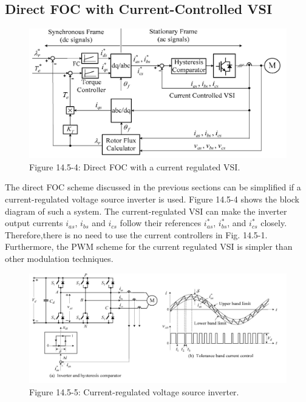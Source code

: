 \documentclass[letterpaper,12pt]{article}
\begin{document}
\subsection{Direct FOC with Current-Controlled VSI}

\begin{figure}[h]
\centering
\includegraphics[scale=0.9]{graficos/img16.jpg}
\caption{Figure 14.5-4: Direct FOC with a current regulated VSI.}
\end{figure}
\FloatBarrier

The direct FOC scheme discussed in the previous sections can be simplified if a current-regulated voltage source inverter is used. Figure 14.5-4 shows the block diagram of such a system. The current-regulated VSI can make the inverter output currents $i_{as}$, $i_{bs}$ and $i_{cs}$ follow their references $i_{as}^*$, $i_{bs}^*$, and $i_{cs}^*$ closely. Therefore,there is no need to use the current controllers in Fig. 14.5-1. Furthermore, the PWM scheme for the current regulated VSI is simpler than other modulation techniques.

\begin{figure}[h]
\centering
\includegraphics[scale=0.8]{graficos/img17.jpg}
\caption{Figure 14.5-5: Current-regulated voltage source inverter.}
\end{figure}
\FloatBarrier
\end{document}
